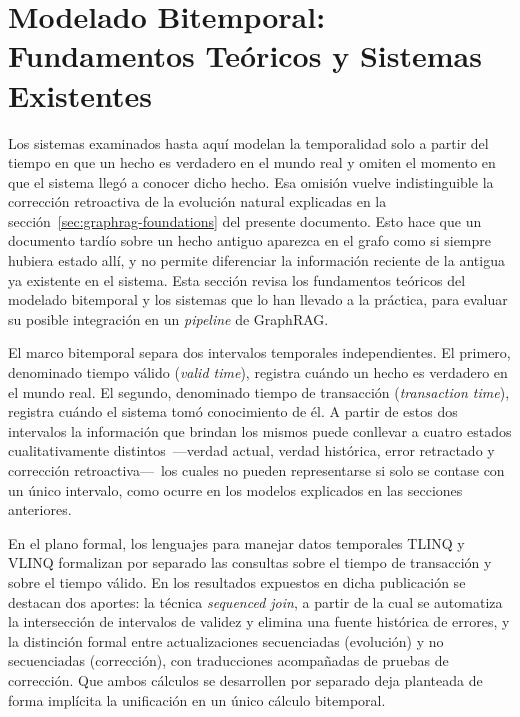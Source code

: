 \section{Modelado Bitemporal: Fundamentos Teóricos y Sistemas Existentes}\label{sec:bitemporal}

Los sistemas examinados hasta aquí modelan la temporalidad solo a partir del tiempo en que un hecho es verdadero en el mundo real y omiten el momento en que el sistema llegó a conocer dicho hecho. Esa omisión vuelve indistinguible la corrección retroactiva de la evolución natural explicadas en la sección~\ref{sec:graphrag-foundations} del presente documento. Esto hace que un documento tardío sobre un hecho antiguo aparezca en el grafo como si siempre hubiera estado allí, y no permite diferenciar la información reciente de la antigua ya existente en el sistema. Esta sección revisa los fundamentos teóricos del modelado bitemporal y los sistemas que lo han llevado a la práctica, para evaluar su posible integración en un \emph{pipeline} de GraphRAG.

El marco bitemporal separa dos intervalos temporales independientes. El primero, denominado tiempo válido (\emph{valid time}), registra cuándo un hecho es verdadero en el mundo real. El segundo, denominado tiempo de transacción (\emph{transaction time}), registra cuándo el sistema tomó conocimiento de él.
A partir de estos dos intervalos la información que brindan los mismos puede conllevar a cuatro estados cualitativamente distintos~---verdad actual, verdad histórica, error retractado y corrección retroactiva---~los cuales no pueden representarse si solo se contase con un único intervalo, como ocurre en los modelos explicados en las secciones anteriores.

En el plano formal, los lenguajes para manejar datos temporales TLINQ y VLINQ \cite{tlinq2022} formalizan por separado las consultas sobre el tiempo de transacción y sobre el tiempo válido. En los resultados expuestos en dicha publicación se destacan dos aportes: la técnica \emph{sequenced join}, a partir de la cual se automatiza la intersección de intervalos de validez y elimina una fuente histórica de errores, y la distinción formal entre actualizaciones secuenciadas (evolución) y no secuenciadas (corrección), con traducciones acompañadas de pruebas de corrección. Que ambos cálculos se desarrollen por separado deja planteada de forma implícita la unificación en un único cálculo bitemporal.

